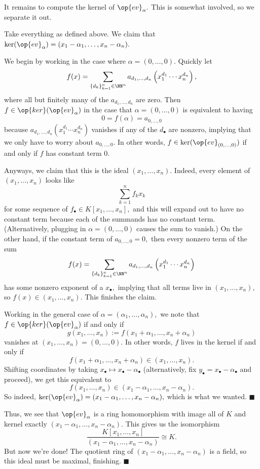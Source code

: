 It remains to compute the kernel of $\op{ev}_\alpha.$ This is somewhat involved, so we separate it out.
\begin{lemma}
    Take everything as defined above. We claim that $\ker(\op{ev}_\alpha)=(x_1-\alpha_1,\ldots,x_n-\alpha_n).$
\end{lemma}
We begin by working in the case where $\alpha=(0,\ldots,0).$ Quickly let
\[f(x)=\sum_{\{d_k\}_{k=1}^n\in\NN^n}a_{d_1,\ldots,d_n}\left(x_1^{d_1}\cdots x_n^{d_n}\right),\]
where all but finitely many of the $a_{d_1,\ldots,d_n}$ are zero. Then $f\in\op{ker}(\op{ev}_\alpha)$ in the case that $\alpha=(0,\ldots,0)$ is equivalent to having
\[0=f(\alpha)=a_{0,\ldots,0}\]
because $a_{d_1,\ldots,d_n}\left(x_1^{d_1}\cdots x_n^{d_n}\right)$ vanishes if any of the $d_\bullet$ are nonzero, implying that we only have to worry about $a_{0,\ldots,0}.$ In other words, $f\in\ker(\op{ev}_{(0,\ldots,0)})$ if and only if $f$ has constant term $0.$

Anyways, we claim that this is the ideal $(x_1,\ldots,x_n).$ Indeed, every element of $(x_1,\ldots,x_n)$ looks like
\[\sum_{k=1}^nf_kx_k\]
for some sequence of $f_\bullet\in K[x_1,\ldots,x_n],$ and this will expand out to have no constant term because each of the summands has no constant term. (Alternatively, plugging in $\alpha=(0,\ldots,0)$ causes the sum to vanish.) On the other hand, if the constant term of $a_{0,\ldots,0}=0,$ then every nonzero term of the sum
\[f(x)=\sum_{\{d_k\}_{k=1}^n\in\NN^n}a_{d_1,\ldots,d_n}\left(x_1^{d_1}\cdots x_n^{d_n}\right)\]
has some nonzero exponent of a $x_\bullet,$ implying that all terms live in $(x_1,\ldots,x_n),$ so $f(x)\in(x_1,\ldots,x_n).$ This finishes the claim.

Working in the general case of $\alpha=(\alpha_1,\ldots,\alpha_n),$ we note that $f\in\op{ker}(\op{ev}_\alpha)$ if and only if
\[g(x_1,\ldots,x_n):=f(x_1+\alpha_1,\ldots,x_n+\alpha_n)\]
vanishes at $(x_1,\ldots,x_n)=(0,\ldots,0).$ In other words, $f$ lives in the kernel if and only if
\[f(x_1+\alpha_1,\ldots,x_n+\alpha_n)\in(x_1,\ldots,x_n).\]
Shifting coordinates by taking $x_\bullet\mapsto x_\bullet-\alpha_\bullet$ (alternatively, fix $y_\bullet=x_\bullet-\alpha_\bullet$ and proceed), we get this equivalent to
\[f(x_1,\ldots,x_n)\in(x_1-\alpha_1,\ldots,x_n-\alpha_n).\]
So indeed, $\ker(\op{ev}_\alpha)=(x_1-\alpha_1,\ldots,x_n-\alpha_n),$ which is what we wanted. $\blacksquare$

Thus, we see that $\op{ev}_\alpha$ is a ring homomorphism with image all of $K$ and kernel exactly $(x_1-\alpha_1,\ldots,x_n-\alpha_n).$ This gives us the isomorphism
\[\frac{K[x_1,\ldots,x_n]}{(x_1-\alpha_1,\ldots,x_n-\alpha_n)}\cong K.\]
But now we're done! The quotient ring of $(x_1-\alpha_1,\ldots,x_n-\alpha_n)$ is a field, so this ideal must be maximal, finishing. $\blacksquare$

